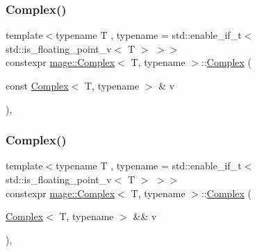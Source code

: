 \mbox{\label{structmage_1_1_complex_a4f7e233a8b8dfb2cafba90278184b46b}} 
\subsubsection{\texorpdfstring{Complex()}{Complex()}\hspace{0.1cm}{\footnotesize\ttfamily [3/5]}}
{\footnotesize\ttfamily template$<$typename T , typename  = std\+::enable\+\_\+if\+\_\+t$<$ std\+::is\+\_\+floating\+\_\+point\+\_\+v$<$ T $>$ $>$$>$ \\
constexpr \mbox{\hyperlink{structmage_1_1_complex}{mage\+::\+Complex}}$<$ T, typename $>$\+::\mbox{\hyperlink{structmage_1_1_complex}{Complex}} (\begin{DoxyParamCaption}\item[{const \mbox{\hyperlink{structmage_1_1_complex}{Complex}}$<$ T, typename $>$ \&}]{v }\end{DoxyParamCaption})\hspace{0.3cm}{\ttfamily [default]}, {\ttfamily [noexcept]}}

\mbox{\label{structmage_1_1_complex_aa194b889d0f622f05fdbd0123c07dee2}} 
\subsubsection{\texorpdfstring{Complex()}{Complex()}\hspace{0.1cm}{\footnotesize\ttfamily [4/5]}}
{\footnotesize\ttfamily template$<$typename T , typename  = std\+::enable\+\_\+if\+\_\+t$<$ std\+::is\+\_\+floating\+\_\+point\+\_\+v$<$ T $>$ $>$$>$ \\
constexpr \mbox{\hyperlink{structmage_1_1_complex}{mage\+::\+Complex}}$<$ T, typename $>$\+::\mbox{\hyperlink{structmage_1_1_complex}{Complex}} (\begin{DoxyParamCaption}\item[{\mbox{\hyperlink{structmage_1_1_complex}{Complex}}$<$ T, typename $>$ \&\&}]{v }\end{DoxyParamCaption})\hspace{0.3cm}{\ttfamily [default]}, {\ttfamily [noexcept]}}

